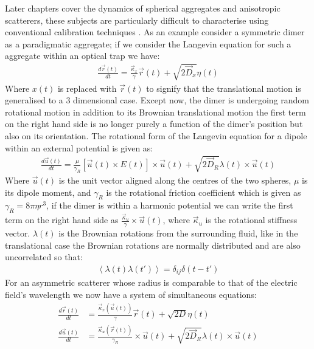 Later chapters cover the dynamics of spherical aggregates and anisotropic scatterers, these subjects are particularly difficult to characterise using conventional calibration techniques \cite{Li2008, Yogesha2011PreciseCO}. As an example consider a symmetric dimer as a paradigmatic aggregate; if we consider the Langevin equation for such a aggregate within an optical trap we have:
\begin{align}
\frac{{d}\vec{r}(t)}{{dt}} = \frac{\vec{\kappa}_x}{\gamma}\vec{r}(t) + \sqrt{2\vec{D}_x}\eta(t)
\end{align}
Where $x(t)$ is replaced with $\vec{r}(t)$ to signify that the translational motion is generalised to a 3 dimensional case. Except now, the dimer is undergoing random rotational motion in addition to its Brownian translational motion the first term on the right hand side is no longer purely a function of the dimer's position but also on its orientation. The rotational form of the Langevin equation for a dipole within an external potential is given as:
\begin{align}
  \frac{{d}\vec{u}(t)}{{dt}}
  =
  \frac{\mu}{\gamma_R}\left[\vec{u}(t)\times E(t)\right]\times \vec{u}(t)
  + \sqrt{2\vec{D}_R}\lambda(t)\times \vec{u}(t)
\end{align}
Where $\vec{u}(t)$ is the unit vector aligned along the centres of the two spheres, $\mu$ is its dipole moment, and $\gamma_R$ is the rotational friction coefficient which is given as $\gamma_R = 8\pi\eta r^3$, if the dimer is within a harmonic potential we can write the first term on the right hand side as $\frac{\vec{\kappa}_u}{\gamma} \times \vec{u}(t)$, where $\vec{\kappa}_u$ is the rotational stiffness vector. $\lambda(t)$ is the Brownian rotations from the surrounding fluid, like in the translational case the Brownian rotations are normally distributed and are also uncorrelated so that:
\begin{align}
  \left<\lambda(t)\lambda(t')\right> = \delta_{ij}\delta(t-t')
\end{align}
For an asymmetric scatterer whose radius is comparable to that of the electric field's wavelength we now have a system of simultaneous equations:
\begin{align}
	\label{eq:full_langevin}
  \frac{{d}\vec{r}(t)}{{dt}}
  &=
    \frac{\vec{\kappa}_x(\vec{u}(t))}{\gamma}\vec{r}(t) + \sqrt{2D}\eta(t)
  \\
  \frac{{d}\vec{u}(t)}{{dt}}
  &=
    \frac{\vec{\kappa}_u(\vec{r}(t))}{\gamma_R}\times \vec{u}(t)
    + \sqrt{2\vec{D}_R}\lambda(t)\times \vec{u}(t)
\end{align}
